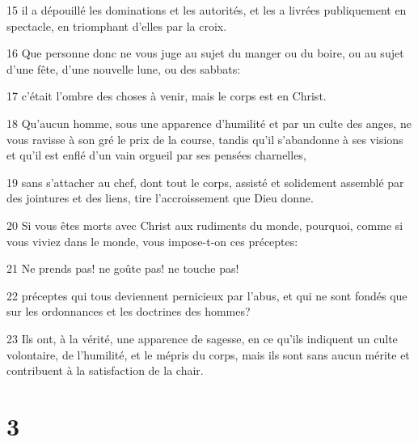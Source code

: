 \par 15 il a dépouillé les dominations et les autorités, et les a livrées publiquement en spectacle, en triomphant d'elles par la croix.
\par 16 Que personne donc ne vous juge au sujet du manger ou du boire, ou au sujet d'une fête, d'une nouvelle lune, ou des sabbats:
\par 17 c'était l'ombre des choses à venir, mais le corps est en Christ.
\par 18 Qu'aucun homme, sous une apparence d'humilité et par un culte des anges, ne vous ravisse à son gré le prix de la course, tandis qu'il s'abandonne à ses visions et qu'il est enflé d'un vain orgueil par ses pensées charnelles,
\par 19 sans s'attacher au chef, dont tout le corps, assisté et solidement assemblé par des jointures et des liens, tire l'accroissement que Dieu donne.
\par 20 Si vous êtes morts avec Christ aux rudiments du monde, pourquoi, comme si vous viviez dans le monde, vous impose-t-on ces préceptes:
\par 21 Ne prends pas! ne goûte pas! ne touche pas!
\par 22 préceptes qui tous deviennent pernicieux par l'abus, et qui ne sont fondés que sur les ordonnances et les doctrines des hommes?
\par 23 Ils ont, à la vérité, une apparence de sagesse, en ce qu'ils indiquent un culte volontaire, de l'humilité, et le mépris du corps, mais ils sont sans aucun mérite et contribuent à la satisfaction de la chair.

\chapter{3}

